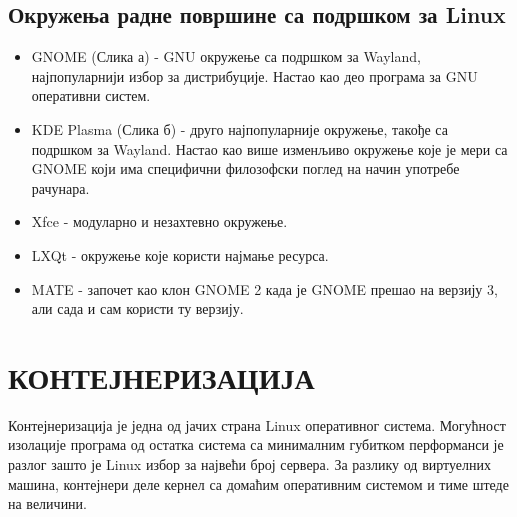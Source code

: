 \documentclass[a4paper,14pt]{article}
\begin{document}
\subsection{Окружења радне површине са подршком за Linux}
\begin{itemize}
\item GNOME\cite{gnome} (Слика а) - GNU окружење са подршком за Wayland, најпопуларнији избор за дистрибуције. Настао као део програма за GNU оперативни систем.
\item KDE Plasma\cite{kdeplasma} (Слика б) - друго најпопуларније окружење, такође са подршком за Wayland. Настао као више изменљиво окружење које је мери са GNOME који има специфични филозофски поглед на начин употребе рачунара.
\item Xfce\cite{xfce} - модуларно и незахтевно окружење.
\item LXQt\cite{lxqt} - окружење које користи најмање ресурса.
\item MATE\cite{mate} - започет као клон GNOME 2 када је GNOME прешао на верзију 3, али сада и сам користи ту верзију.
\end{itemize}
\begin{figure}[h]
	\centering
    \hspace{0.5cm}
\end{figure}
\newpage

\section{КОНТЕЈНЕРИЗАЦИЈА}
Контејнеризација је једна од јачих страна Linux оперативног система. Могућност изолације програма од остатка система са минималним губитком перформанси је разлог зашто је Linux избор за највећи број сервера. За разлику од виртуелних машина, контејнери деле кернел са домаћим оперативним системом и тиме штеде на величини.
\end{document}
